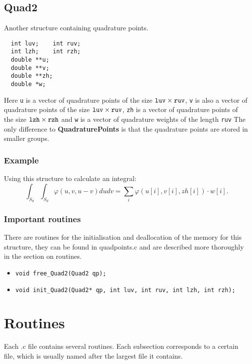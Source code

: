 \documentclass[a4paper,10pt]{article}
\begin{document}
\subsection{Quad2}
Another structure containing quadrature points. 
\begin{verbatim}
  int luv;    int ruv;       
  int lzh;    int rzh;          
  double **u;
  double **v;
  double **zh;
  double *w;
\end{verbatim}
Here \verb=u= is a vector of quadrature points of the size $\verb=luv= \times \verb=ruv=$,
 \verb=v= is also a vector of quadrature points of the size $\verb=luv= \times \verb=ruv=$,
\verb=zh= is a vector of quadrature points of the size $\verb=lzh= \times \verb=rzh=$ and
\verb=w= is a vector of quadrature weights of the length \verb=ruv=
The only difference to \textbf{QuadraturePoints} is that the quadrature points are stored in smaller groups.
\subsubsection*{Example}
 Using this structure to calculate an integral:
\begin{displaymath}
  \int_{S_d} \int_{S_d} \varphi(u,v,u-v) du dv = \sum_i \varphi(u[i],v[i],zh[i])\cdot w[i].
\end{displaymath}

\subsubsection*{Important routines}
There are routines for the initialisation and deallocation of the memory for this structure, they can be 
found in quadpoints.c and are described more thoroughly in the section on routines.
\begin{itemize}
\item \begin{verbatim}void free_Quad2(Quad2 qp);\end{verbatim}
\item \begin{verbatim}void init_Quad2(Quad2* qp, int luv, int ruv, int lzh, int rzh);\end{verbatim}
\end{itemize}
\newpage

\section{Routines}
Each .c file contains several routines. Each subsection corresponds to a certain file, which is usually named
after the largest file it contains.
\end{document}
